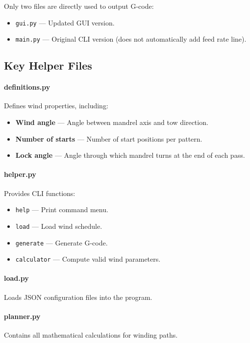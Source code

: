 \documentclass[12pt]{article}
\begin{document}
Only two files are directly used to output G-code:

\begin{itemize}
    \item \texttt{gui.py} --- Updated GUI version.
    \item \texttt{main.py} --- Original CLI version (does not automatically add feed rate line).
\end{itemize}

\subsection{Key Helper Files}

\paragraph{definitions.py} Defines wind properties, including:

\begin{itemize}
    \item \textbf{Wind angle} --- Angle between mandrel axis and tow direction.
    \item \textbf{Number of starts} --- Number of start positions per pattern.
    \item \textbf{Lock angle} --- Angle through which mandrel turns at the end of each pass.
\end{itemize}

\paragraph{helper.py} Provides CLI functions:

\begin{itemize}
    \item \texttt{help} --- Print command menu.
    \item \texttt{load} --- Load wind schedule.
    \item \texttt{generate} --- Generate G-code.
    \item \texttt{calculator} --- Compute valid wind parameters.
\end{itemize}

\paragraph{load.py} Loads JSON configuration files into the program.

\paragraph{planner.py} Contains all mathematical calculations for winding paths.
\end{document}
